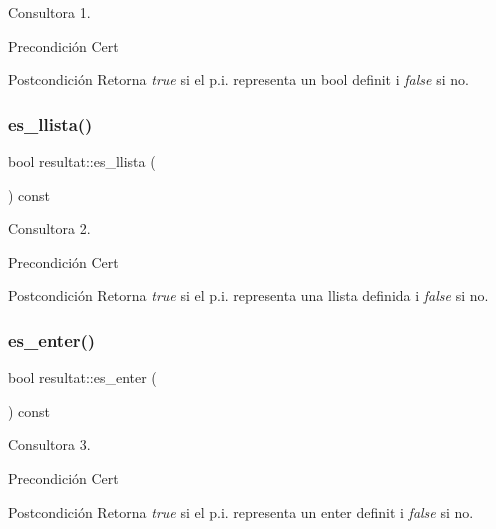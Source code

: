 Consultora 1. 

\begin{DoxyPrecond}{Precondición}
Cert 
\end{DoxyPrecond}
\begin{DoxyPostcond}{Postcondición}
Retorna {\itshape true} si el p.\+i. representa un bool definit i {\itshape false} si no. 
\end{DoxyPostcond}
\hypertarget{classresultat_a38e2b83a0bac16445b80e553321d1a61}{}\label{classresultat_a38e2b83a0bac16445b80e553321d1a61} 
\subsubsection{\texorpdfstring{es\+\_\+llista()}{es\_llista()}}
{\footnotesize\ttfamily bool resultat\+::es\+\_\+llista (\begin{DoxyParamCaption}{ }\end{DoxyParamCaption}) const}



Consultora 2. 

\begin{DoxyPrecond}{Precondición}
Cert 
\end{DoxyPrecond}
\begin{DoxyPostcond}{Postcondición}
Retorna {\itshape true} si el p.\+i. representa una llista definida i {\itshape false} si no. 
\end{DoxyPostcond}
\hypertarget{classresultat_a6d111168a77585236466639eb058a1bf}{}\label{classresultat_a6d111168a77585236466639eb058a1bf} 
\subsubsection{\texorpdfstring{es\+\_\+enter()}{es\_enter()}}
{\footnotesize\ttfamily bool resultat\+::es\+\_\+enter (\begin{DoxyParamCaption}{ }\end{DoxyParamCaption}) const}



Consultora 3. 

\begin{DoxyPrecond}{Precondición}
Cert 
\end{DoxyPrecond}
\begin{DoxyPostcond}{Postcondición}
Retorna {\itshape true} si el p.\+i. representa un enter definit i {\itshape false} si no. 
\end{DoxyPostcond}
\hypertarget{classresultat_a82069f4c30872bf0129366d4d998a788}{}\label{classresultat_a82069f4c30872bf0129366d4d998a788} 
